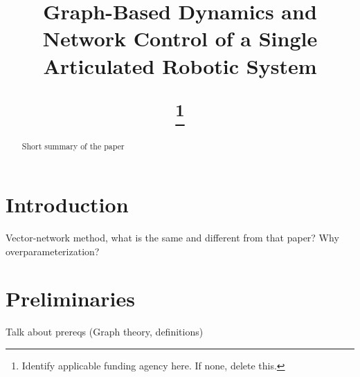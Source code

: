 \documentclass[conference]{IEEEtran}
\begin{document}
\title{

Graph-Based Dynamics and Network Control of a Single Articulated Robotic System


\thanks{Identify applicable funding agency here. If none, delete this.}
}

\author{
\and
{}
}

\maketitle

\begin{abstract}
Short summary of the paper
\end{abstract}

\section{Introduction}
Vector-network method, what is the same and different from that paper?
Why overparameterization?

\section{Preliminaries}
Talk about prereqs (Graph theory, definitions)
\end{document}
